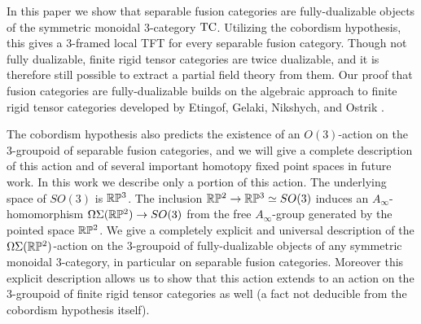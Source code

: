 \documentclass{amsart}
\begin{document}

In this paper we show that separable fusion categories are fully-dualizable objects of the symmetric monoidal 3-category $\mathrm{TC}$. Utilizing the cobordism hypothesis, this gives a 3-framed local TFT for every separable fusion category. 
Though not fully dualizable, finite rigid tensor categories are twice dualizable, and it is therefore still possible to extract a partial field theory from them.  
Our proof that fusion categories are fully-dualizable builds on the algebraic approach to finite rigid tensor categories developed by Etingof, Gelaki, Nikshych, and Ostrik \cite{EGNO, MR2119143, MR2183279, MR2097289}.

The cobordism hypothesis also predicts the existence of an $O(3)$-action on the 3-groupoid of separable fusion categories, and we will give a complete description of this action and of several important homotopy fixed point spaces in future work. In this work we describe only a portion of this action. The underlying space of $SO(3)$ is $\mathbb R \mathbb P^3$. The inclusion $\mathbb R \mathbb P^2 \to \mathbb R \mathbb P^3 \simeq SO(3)$ induces an $A_\infty$-homomorphism $\Omega \Sigma (\mathbb R \mathbb P^2) \to SO(3)$ from the free $A_\infty$-group generated by the pointed space $\mathbb R \mathbb P^2$. We give a completely explicit and universal description of the $\Omega \Sigma (\mathbb R \mathbb P^2)$-action on the 3-groupoid of fully-dualizable objects of any symmetric monoidal 3-category, in particular on separable fusion categories. Moreover this explicit description allows us to show that this action extends to an action on the 3-groupoid of finite rigid tensor categories as well (a fact not deducible from the cobordism hypothesis itself).  
\end{document}

